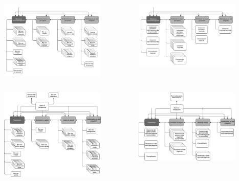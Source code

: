 \documentclass[handout]{beamer}
\begin{document}
		\begin{frame}
			\begin{columns}[t]
					\begin{column}[T]{5cm}
						\includegraphics[width=5cm]{img/blueprint-prog-2}
					\end{column}
					\begin{column}[T]{5cm}
						\includegraphics[width=5cm]{img/blueprint-cont-2}
					\end{column}
			\end{columns}
		\end{frame}

		\begin{frame}
			\begin{columns}[t]
					\begin{column}[T]{5cm}
						\includegraphics[width=5cm]{img/blueprint-prog-4}
					\end{column}
					\begin{column}[T]{5cm}
						\includegraphics[width=5cm]{img/blueprint-cont-4}
					\end{column}
			\end{columns}
		\end{frame}
\end{document}
